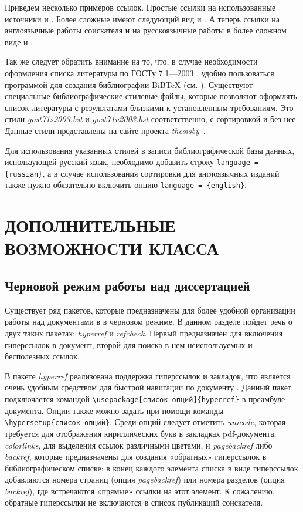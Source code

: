 Приведем несколько примеров ссылок. Простые ссылки на использованные источники
\cite{Kotelnikov,article} и 
\cite{proc}. Более сложные имеют следующий вид \cite[с. 25]{Kotelnikov} и
\cite[формула 2]{article}. А теперь ссылки на англоязычные работы соискателя
\cite{myarticle,myproc}  и на русскоязычные работы в более сложном виде
\cite[формула~4]{myrussianarticle} и \cite[глава~2]{mybook}.

Так же следует обратить внимание на то, что, в случае необходимости оформления
списка литературы по ГОСТу 7.1—2003 \cite{gost7-1}, удобно пользоваться программой для создания библиографии BiBTeX (см. \cite[глава 13]{Kotelnikov}). Существуют специальные
библиографические стилевые файлы, которые позволяют оформлять список литературы
с результатами близкими к установленным требованиям. Это стили {\itshape
gost71s2003.bst} и {\itshape gost71u2003.bst} соответственно, с сортировкой и без
нее. Данные стили представлены на сайте проекта {\itshape thesisby}~\cite{gost71_2003}.

Для использования указанных стилей в записи  библиографической базы
данных, использующей русский язык, необходимо добавить строку
\verb|language = {russian}|, а в случае использования сортировки для англоязычных изданий также нужно обязательно включить опцию \verb|language = {english}|.


\chapter{ДОПОЛНИТЕЛЬНЫЕ ВОЗМОЖНОСТИ КЛАССА}

\section{Черновой режим работы над диссертацией}
\label{chap:draft}

Существует ряд пакетов, которые предназначены для более удобной организации
работы над документами в \LaTeXe{} в черновом режиме. В данном разделе пойдет
речь о двух  таких пакетах: {\itshape hyperref} и {\itshape refcheck}. Первый
предназначен для включения гиперссылок в документ, второй для поиска в нем
неиспользуемых и бесполезных ссылок.

В пакете {\itshape hyperref} реализована поддержка гиперссылок и закладок, что является очень удобным средством для быстрой навигации по документу \cite{hyperref}. Данный пакет подключается командой \verb|\usepackage[список опций]{hyperref}| в преамбуле документа. Опции также можно задать при помощи команды \verb|\hypersetup{список опций}|. Среди опций следует отметить {\itshape unicode}, которая требуется для отображения кириллических букв в закладках pdf-документа, {\itshape colorlinks}, для выделения ссылок различными цветами, и {\itshape pagebackref} либо {\itshape  backref}, которые предназначены для создания «обратных» гиперссылок в библиографическом списке: в конец каждого элемента списка в виде гиперссылок добавляются номера страниц (опция {\itshape pagebackref}) или номера разделов (опция {\itshape backref}), где встречаются «прямые» ссылки на этот элемент. К сожалению, обратные гиперссылки не включаются в список публикаций соискателя.

